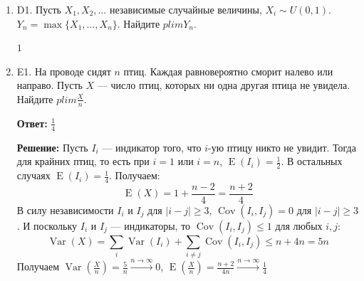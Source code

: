 \documentclass[12pt]{article}
\DeclareMathOperator{\Cov}{Cov}
\DeclareMathOperator{\Var}{Var}
\DeclareMathOperator{\E}{E}
\newenvironment{problem}{}{}
\newenvironment{sol}{}{} %
\begin{document}
\begin{enumerate}
\begin{problem}
\begin{sol}
\end{sol}
\end{problem}

\begin{problem}
\item[D1.] Пусть $X_1, X_2, \ldots $ независимые случайные величины, $X_i \sim U(0,1)$. $Y_n = \max\{X_1, \ldots, X_n\}$. Найдите $plim Y_n$.

\begin{sol}
$1$
\end{sol}
\end{problem}

\begin{problem}
\item[E1.] На проводе сидят $n$ птиц. Каждая равновероятно сморит налево или направо. Пусть $X$ — число птиц, которых ни одна другая птица не увидела. Найдите $plim \frac{X}{n}$.  

\begin{sol}

\textbf{Ответ:} $\frac{1}{4}$

\textbf{Решение:} Пусть $I_i$ — индикатор того, что $i$-ую птицу никто не увидит. Тогда для крайних птиц, то есть при $i=1$ или $i=n$, $\E(I_i) = \frac{1}{2}$. В остальных случаях $\E(I_i) = \frac{1}{4}$. Получаем:
\[
\E(X) = 1 + \frac{n-2}{4} = \frac{n+2}{4}
\]
В силу независимости $I_i$ и $I_j$ для $|i-j|\geq 3$, $\Cov(I_i, I_j) = 0$ для $|i-j|\geq 3$. И поскольку $I_i$ и $I_j$ — индикаторы, то $\Cov(I_i, I_j) \leq 1$ для любых $i, j$:
\[
\Var(X) = \sum_i \Var(I_i) + \sum_{i \not= j} \Cov(I_i, I_j) \leq n + 4n = 5n
\]
Получаем $\Var \left(\frac{X}{n} \right) = \frac{5}{n} \stackrel{n \to \infty}{\to} 0$, $\E\left(\frac{X}{n}\right) = \frac{n+2}{4n} \stackrel{n \to \infty}{\to} \frac{1}{4}$
\end{sol}
\end{problem}
\end{enumerate}




\newpage
\end{document}
